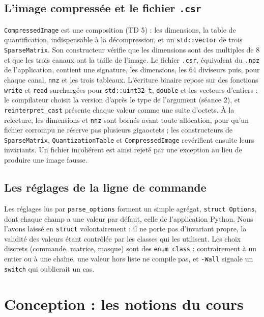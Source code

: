 \documentclass[10pt,a4paper]{article}
\newcommand{\code}[1]{\texttt{#1}}
\begin{document}
\subsection{L'image compressée et le fichier \texorpdfstring{\code{.csr}}{.csr}}
\code{CompressedImage} est une composition (TD 5) : les dimensions, la table de quantification,
indispensable à la décompression, et un \code{std::vector} de trois \code{SparseMatrix}. Son
constructeur vérifie que les dimensions sont des multiples de 8 et que les trois canaux ont la
taille de l'image. Le fichier \code{.csr}, équivalent du \code{.npz} de l'application, contient
une signature, les dimensions, les 64 diviseurs puis, pour chaque canal, \code{nnz} et les trois
tableaux. L'écriture binaire repose sur des fonctions \code{write} et \code{read} surchargées
pour \code{std::uint32\_t}, \code{double} et les vecteurs d'entiers : le compilateur choisit la
version d'après le type de l'argument (séance 2), et \code{reinterpret\_cast} présente chaque
valeur comme une suite d'octets. À la relecture, les dimensions et \code{nnz} sont bornés avant
toute allocation, pour qu'un fichier corrompu ne réserve pas plusieurs gigaoctets ; les
constructeurs de \code{SparseMatrix}, \code{QuantizationTable} et \code{CompressedImage}
revérifient ensuite leurs invariants. Un fichier incohérent est ainsi rejeté par une exception
au lieu de produire une image fausse.

\subsection{Les réglages de la ligne de commande}
Les réglages lus par \code{parse\_options} forment un simple agrégat, \code{struct Options},
dont chaque champ a une valeur par défaut, celle de l'application Python. Nous l'avons laissé en
\code{struct} volontairement : il ne porte pas d'invariant propre, la validité des valeurs étant
contrôlée par les classes qui les utilisent. Les choix discrets (commande, matrice, masque) sont
des \code{enum class} : contrairement à un entier ou à une chaîne, une valeur hors liste ne
compile pas, et \code{-Wall} signale un \code{switch} qui oublierait un cas.

\section{Conception : les notions du cours}
\end{document}

